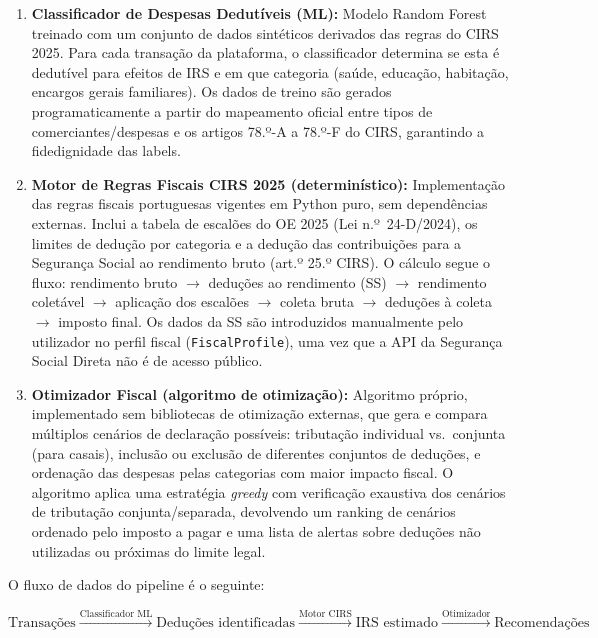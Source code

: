 \begin{enumerate}
    \item \textbf{Classificador de Despesas Dedutíveis (ML):} Modelo Random Forest treinado com um conjunto de dados sintéticos derivados das regras do \ac{CIRS} 2025. Para cada transação da plataforma, o classificador determina se esta é dedutível para efeitos de \ac{IRS} e em que categoria (saúde, educação, habitação, encargos gerais familiares). Os dados de treino são gerados programaticamente a partir do mapeamento oficial entre tipos de comerciantes/despesas e os artigos 78.º-A a 78.º-F do \ac{CIRS}, garantindo a fidedignidade das labels.

    \item \textbf{Motor de Regras Fiscais CIRS 2025 (determinístico):} Implementação das regras fiscais portuguesas vigentes em Python puro, sem dependências externas. Inclui a tabela de escalões do \ac{OE} 2025 (Lei n.º~24-D/2024), os limites de dedução por categoria e a dedução das contribuições para a Segurança Social ao rendimento bruto (art.º 25.º \ac{CIRS}). O cálculo segue o fluxo: rendimento bruto $\rightarrow$ deduções ao rendimento (SS) $\rightarrow$ rendimento coletável $\rightarrow$ aplicação dos escalões $\rightarrow$ coleta bruta $\rightarrow$ deduções à coleta $\rightarrow$ imposto final. Os dados da \ac{SS} são introduzidos manualmente pelo utilizador no perfil fiscal (\texttt{FiscalProfile}), uma vez que a \ac{API} da Segurança Social Direta não é de acesso público.

    \item \textbf{Otimizador Fiscal (algoritmo de otimização):} Algoritmo próprio, implementado sem bibliotecas de otimização externas, que gera e compara múltiplos cenários de declaração possíveis: tributação individual vs.\ conjunta (para casais), inclusão ou exclusão de diferentes conjuntos de deduções, e ordenação das despesas pelas categorias com maior impacto fiscal. O algoritmo aplica uma estratégia \textit{greedy} com verificação exaustiva dos cenários de tributação conjunta/separada, devolvendo um ranking de cenários ordenado pelo imposto a pagar e uma lista de alertas sobre deduções não utilizadas ou próximas do limite legal.
\end{enumerate}

O fluxo de dados do pipeline é o seguinte:

\[
\text{Transações} \xrightarrow{\text{Classificador ML}} \text{Deduções identificadas} \xrightarrow{\text{Motor CIRS}} \text{IRS estimado} \xrightarrow{\text{Otimizador}} \text{Recomendações}
\]

